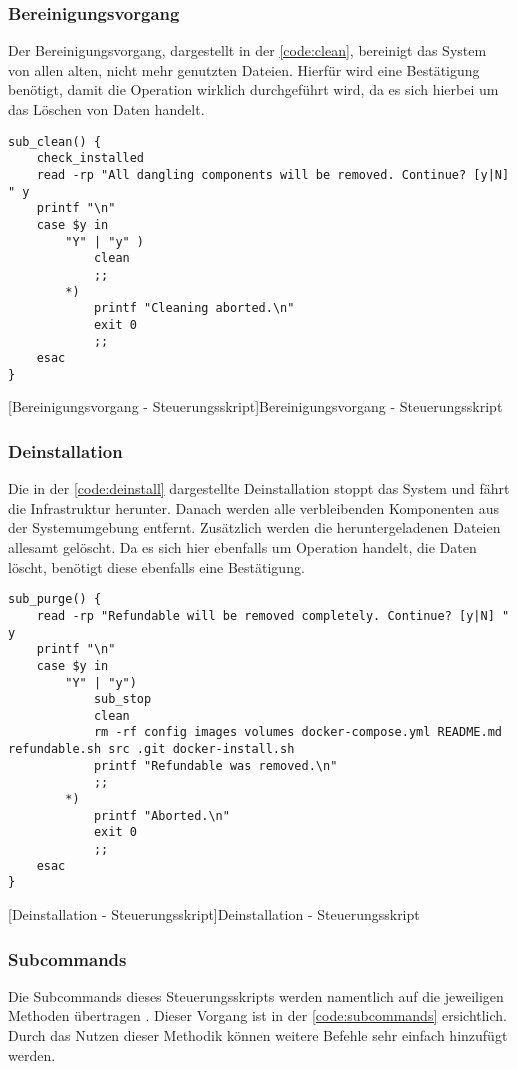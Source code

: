 \subsubsection{Bereinigungsvorgang}

Der Bereinigungsvorgang, dargestellt in der \autoref{code:clean}, bereinigt das System von allen alten, nicht mehr genutzten Dateien. Hierfür wird eine Bestätigung benötigt, damit die Operation wirklich durchgeführt wird, da es sich hierbei um das Löschen von Daten handelt.

\begin{verbatim}
sub_clean() {
	check_installed
	read -rp "All dangling components will be removed. Continue? [y|N] " y
	printf "\n"
	case $y in
		"Y" | "y" )
			clean
			;;
		*)
			printf "Cleaning aborted.\n"
			exit 0
			;;
	esac
}
\end{verbatim}
[Bereinigungsvorgang - Steuerungsskript]{Bereinigungsvorgang - Steuerungsskript}
\label{code:clean}

\newpage

\subsubsection{Deinstallation}
Die in der \autoref{code:deinstall} dargestellte Deinstallation stoppt das System und fährt die Infrastruktur herunter. Danach werden alle verbleibenden Komponenten aus der Systemumgebung entfernt. Zusätzlich werden die heruntergeladenen Dateien allesamt gelöscht. Da es sich hier ebenfalls um Operation handelt, die Daten löscht, benötigt diese ebenfalls eine Bestätigung.

\begin{verbatim}
sub_purge() {
	read -rp "Refundable will be removed completely. Continue? [y|N] " y
	printf "\n"
	case $y in
		"Y" | "y")
			sub_stop
			clean
			rm -rf config images volumes docker-compose.yml README.md refundable.sh src .git docker-install.sh
			printf "Refundable was removed.\n"
			;;
		*)
			printf "Aborted.\n"
			exit 0
			;;
	esac
}
\end{verbatim}
[Deinstallation - Steuerungsskript]{Deinstallation - Steuerungsskript}
\label{code:deinstall}

\subsubsection{Subcommands}

Die Subcommands dieses Steuerungsskripts werden namentlich auf die jeweiligen Methoden übertragen \cite{shgist}. Dieser Vorgang ist in der \autoref{code:subcommands} ersichtlich. Durch das Nutzen dieser Methodik können weitere Befehle sehr einfach hinzufügt werden.

